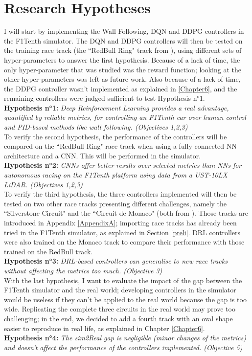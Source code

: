 \section{Research Hypotheses}
\label{reshypo}
I will start by implementing the Wall Following, DQN and DDPG controllers in the F1Tenth simulator. The DQN and DDPG controllers will then be tested on the training race track (the ``RedBull Ring" track from \cite{bosello}), using different sets of hyper-parameters to answer the first hypothesis. Because of a lack of time, the only hyper-parameter that was studied was the reward function; looking at the other hyper-parameters was left as future work. Also because of a lack of time, the DDPG controller wasn't implemented as explained in \ref{Chapter6}, and the remaining controllers were judged sufficient to test Hypothesis n°1. \\
\textbf{Hypothesis n°1:} \textit{Deep Reinforcement Learning provides a real advantage, quantified by reliable metrics, for controlling an F1Tenth car over human control and PID-based methods like wall following. (Objectives 1,2,3)} \\
To verify the second hypothesis, the performance of the controllers will be compared on the ``RedBull Ring" race track when using a fully connected NN architecture and a CNN. This will be performed in the simulator. \\
\textbf{Hypothesis n°2:} \textit{CNNs offer better results over selected metrics than NNs for autonomous racing on the F1Tenth platform using data from a UST-10LX LiDAR. (Objectives 1,2,3)}\\
To verify the third hypothesis, the three controllers implemented will then be tested on two other race tracks presenting different challenges, namely the ``Silverstone Circuit" and the ``Circuit de Monaco" (both from \cite{bosello}). Those tracks are introduced in Appendix \ref{AppendixA}; importing race tracks has already been tried in the F1Tenth simulator, as explained in Section \ref{preli}. DRL controllers were also trained on the Monaco track to compare their performance with those trained on the RedBull track.\\
\textbf{Hypothesis n°3:} \textit{DRL-based controllers can generalise to new race tracks without affecting the metrics too much. (Objective 3)} \\
With the last hypothesis, I want to evaluate the impact of the gap between the F1Tenth simulator and the real world; developing controllers in the simulator would be useless if they can't be applied to the real world because the gap is too wide. Replicating the complete three circuits in the real world may prove too challenging; in the end, we decided to add a fourth track with an oval shape easier to reproduce in real life, as explained in Chapter \ref{Chapter6}.\\
\textbf{Hypothesis n°4:} \textit{The sim2Real gap is negligible (minor changes of the metrics) and doesn't affect the performance of the controllers implemented. (Objective 5)}\\


